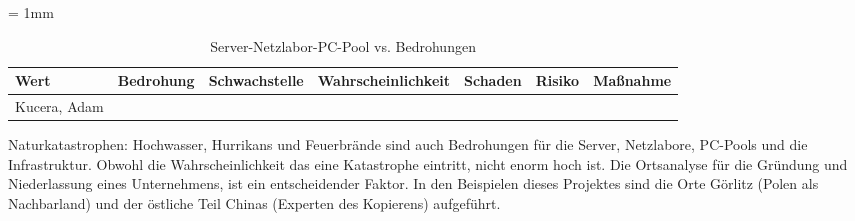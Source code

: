 \begin{table}[H]
	\sffamily
	\caption{Server-Netzlabor-PC-Pool vs. Bedrohungen}
	\tabulinesep = 1mm %
	\centering
		\begin{tabu} to 0.9\textwidth {| X[1] | X[1] | X[1] | X[1] | X[1] | X[1] | X[1] |}
		\hline
		\textbf{Wert} & \textbf{Bedrohung} & \textbf{Schwachstelle} & \textbf{Wahrscheinlichkeit} & \textbf{Schaden} & \textbf{Risiko} & \textbf{Maßnahme}\\
		\hline 
		Kucera, Adam &  & & & & &\\
		\hline
	\end{tabu}
\end{table}

Naturkatastrophen: Hochwasser, Hurrikans und Feuerbrände sind auch Bedrohungen für die Server, Netzlabore, PC-Pools und die Infrastruktur. Obwohl die Wahrscheinlichkeit das eine Katastrophe eintritt, nicht enorm hoch ist. 
Die Ortsanalyse für die Gründung und Niederlassung eines Unternehmens, ist ein entscheidender Faktor. In den Beispielen dieses Projektes sind die Orte Görlitz (Polen als Nachbarland) und der östliche Teil Chinas (Experten des Kopierens) aufgeführt.
